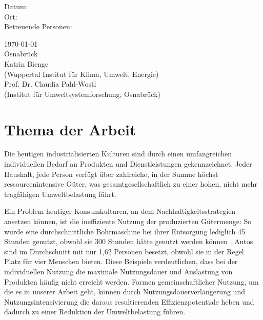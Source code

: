\documentclass[11pt, titlepage=true]{scrartcl} %
\newcommand{\betreuungOne}{Katrin Bienge}
\newcommand{\betreuungTwo}{Prof. Dr. Claudia Pahl-Wostl}
\newcommand{\institutOne}{Wuppertal Institut für Klima, Umwelt, Energie}
\newcommand{\institutTwo}{Institut für Umweltsystemforschung, Osnabrück}
\newcommand{\ort}{Osnabrück}
\begin{document}
\begin{titlepage}
\begin{center}
      \vspace{2cm}
      \begin{minipage}[t]{0.45\textwidth}
        \begin{flushright}
          Datum:              \\[1.2ex]
          Ort:                \\[1.2ex]
          Betreuende Personen:\\
        \end{flushright}
      \end{minipage}
      \hspace{0.01\textwidth}
      \begin{minipage}[t]{0.45\textwidth}
        \begin{flushleft}
          \today\\[1.2ex]
          \ort\\[1.2ex]
          \betreuungOne\\
          (\institutOne) \\[1.2ex]
          \betreuungTwo\\
          (\institutTwo) \\
        \end{flushleft}
      \end{minipage}
  \end{center}
\end{titlepage}
\tableofcontents
\section{Thema der Arbeit}
Die heutigen industrialisierten Kulturen sind durch einen umfangreichen
individuellen Bedarf an Produkten und Dienstleistungen gekennzeichnet. Jeder
Haushalt, jede Person verfügt über zahlreiche, in der Summe höchst
ressourcenintensive Güter, was gesamtgesellschaftlich zu einer hohen, nicht mehr
tragfähigen Umweltbelastung führt.

Ein Problem heutiger Konsumkulturen, an dem Nachhaltigkeitsstrategien ansetzen
können, ist die ineffiziente Nutzung der produzierten Gütermenge: So wurde eine
durchschnittliche Bohrmaschine bei ihrer Entsorgung lediglich 45 Stunden
genutzt, obwohl sie 300
Stunden hätte genutzt werden können \parencite{behrendt_oko-rent_2000}. Autos
sind im Durchschnitt mit nur 1,62 Personen besetzt, obwohl sie in der Regel
Platz für vier Menschen bieten\parencite[zitiert nach:
\cite{behrendt_car-sharing_2000}]{baum_untersuchungen_1994}. Diese Beispiele
verdeutlichen, dass bei der individuellen Nutzung die maximale Nutzungsdauer und
Auslastung von Produkten häufig nicht erreicht werden. Formen gemeinschaftlicher
Nutzung, um die es in unserer Arbeit geht, können durch
Nutzungsdauerverlängerung und Nutzungsintensivierung die daraus resultierenden
Effizienzpotentiale heben und dadurch zu einer Reduktion der Umweltbelastung
führen.
\end{document}
